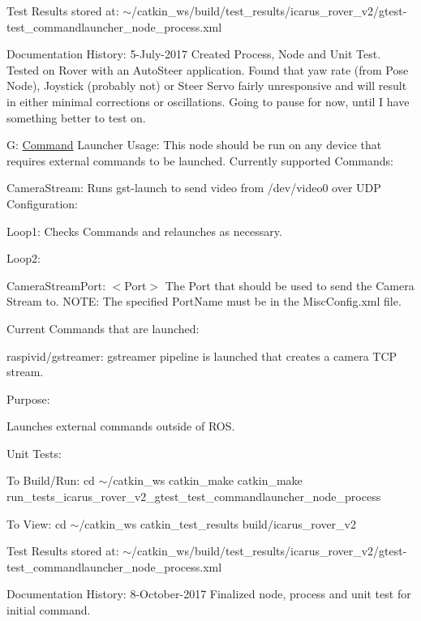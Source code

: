 Test Results stored at\+: $\sim$/catkin\+\_\+ws/build/test\+\_\+results/icarus\+\_\+rover\+\_\+v2/gtest-\/test\+\_\+commandlauncher\+\_\+node\+\_\+process.xml

Documentation History\+: 5-\/\+July-\/2017 Created Process, Node and Unit Test. Tested on Rover with an Auto\+Steer application. Found that yaw rate (from Pose Node), Joystick (probably not) or Steer Servo fairly unresponsive and will result in either minimal corrections or oscillations. Going to pause for now, until I have something better to test on.

G\+: \hyperlink{structCommand}{Command} Launcher Usage\+: This node should be run on any device that requires external commands to be launched. Currently supported Commands\+:
\begin{DoxyItemize}
\item Camera\+Stream\+: Runs gst-\/launch to send video from /dev/video0 over U\+DP Configuration\+:
\item Loop1\+: Checks Commands and relaunches as necessary.
\item Loop2\+:
\item Camera\+Stream\+Port\+: $<$\+Port$>$ The Port that should be used to send the Camera Stream to. N\+O\+TE\+: The specified Port\+Name must be in the Misc\+Config.\+xml file.
\end{DoxyItemize}

Current Commands that are launched\+:
\begin{DoxyItemize}
\item raspivid/gstreamer\+: gstreamer pipeline is launched that creates a camera T\+CP stream.
\end{DoxyItemize}

Purpose\+:
\begin{DoxyEnumerate}
\item Launches external commands outside of R\+OS.
\end{DoxyEnumerate}

Unit Tests\+:
\begin{DoxyEnumerate}
\item To Build/\+Run\+: cd $\sim$/catkin\+\_\+ws catkin\+\_\+make catkin\+\_\+make run\+\_\+tests\+\_\+icarus\+\_\+rover\+\_\+v2\+\_\+gtest\+\_\+test\+\_\+commandlauncher\+\_\+node\+\_\+process
\item To View\+: cd $\sim$/catkin\+\_\+ws catkin\+\_\+test\+\_\+results build/icarus\+\_\+rover\+\_\+v2
\end{DoxyEnumerate}

Test Results stored at\+: $\sim$/catkin\+\_\+ws/build/test\+\_\+results/icarus\+\_\+rover\+\_\+v2/gtest-\/test\+\_\+commandlauncher\+\_\+node\+\_\+process.xml

Documentation History\+: 8-\/\+October-\/2017 Finalized node, process and unit test for initial command. 